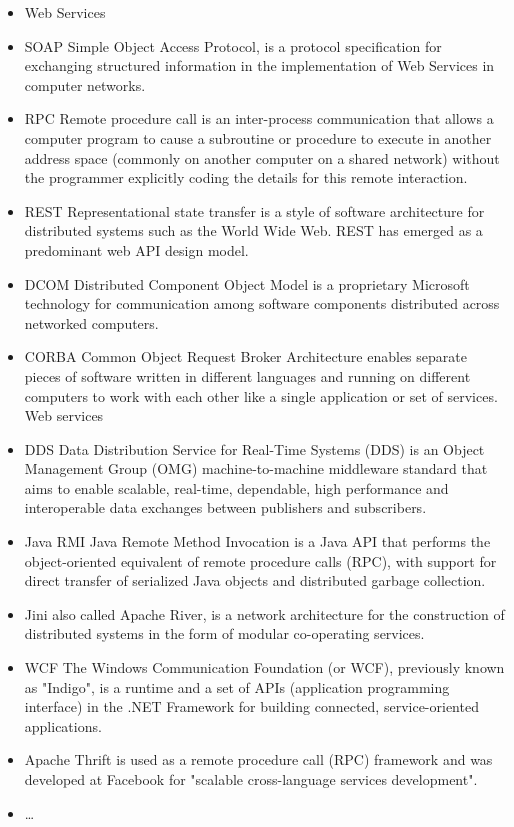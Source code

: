 \begin{itemize}
  \item \label{itm:soa_technologies} Web Services
  \item{SOAP} Simple Object Access Protocol, is a protocol specification for exchanging structured information in the implementation of Web Services in computer networks.
  \item{RPC} Remote procedure call is an inter-process communication that allows
  a computer program to cause a subroutine or procedure to execute in another address space (commonly on another computer on a shared network) without the programmer explicitly coding the details for this remote interaction. 
  \item{REST} Representational state transfer is a style of software architecture for distributed systems such as the World Wide Web. REST has emerged as a predominant web API design model.
  \item{DCOM} Distributed Component Object Model is a proprietary Microsoft technology for communication among software components distributed across networked computers. 
  \item{CORBA}  Common Object Request Broker Architecture enables separate pieces of software written in different
    languages and running on different computers to work with each other like a single application or set of services. Web services
  \item{DDS} Data Distribution Service for Real-Time Systems (DDS) is an Object
  Management Group (OMG) machine-to-machine middleware standard that aims to
  enable scalable, real-time, dependable, high performance and interoperable data exchanges between publishers and subscribers. 
  \item{Java RMI} Java Remote Method Invocation is a Java API that performs the
  object-oriented equivalent of remote procedure calls (RPC), with support for direct transfer of serialized Java objects and distributed garbage collection.
  \item{Jini}  also called Apache River, is a network architecture for the construction of distributed systems in the form of modular co-operating services.
  \item{WCF} The Windows Communication Foundation (or WCF), previously known as
  "Indigo", is a runtime and a set of APIs (application programming interface)
  in the .NET Framework for building connected, service-oriented applications.
  \item{Apache Thrift} is used as a remote procedure call (RPC) framework and
  was developed at Facebook for "scalable cross-language services development".
  \item \ldots
\end{itemize}

